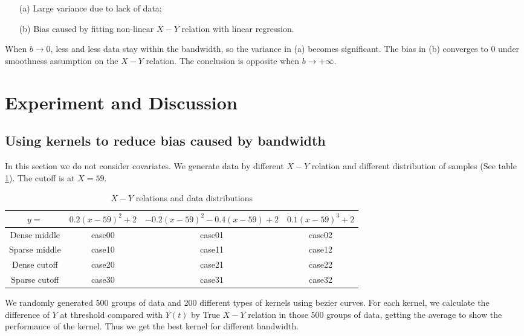 \documentclass[a4 paper,12pt]{article}
\begin{document}
\begin{enumerate}
   \item[(a)] Large variance due to lack of data;
   \item[(b)] Bias caused by fitting non-linear $X-Y$ relation with linear regression.
\end{enumerate}

When $b\to 0$, less and less data stay within the bandwidth, so the variance in (a) becomes significant. The bias in (b) converges to $0$ under smoothness assumption on the $X-Y$ relation. The conclusion is opposite when $b\to+\infty$.


\section{Experiment and Discussion}

\subsection{Using kernels to reduce bias caused by bandwidth}

In this section we do not consider covariates. We generate data by different $X-Y$ relation and different distribution of samples (See table \ref{table:kernels_test}). The cutoff is at $X=59$.

\begin{table}[h]
	\centering
   \begin{tabular}{|c|c|c|c|}
      \hline
      $y=$&$0.2(x-59)^2+2$&$-0.2(x-59)^2-0.4(x-59)+2$&$0.1(x-59)^3+2$\\
      \hline
      Dense middle&case00&case01&case02\\
      \hline
      Sparse middle&case10&case11&case12\\
      \hline
      Dense cutoff&case20&case21&case22\\
      \hline
      Sparse cutoff&case30&case31&case32\\
      \hline
   \end{tabular}
   \caption{$X-Y$ relations and data distributions}
   \label{table:kernels_test}
\end{table}

We randomly generated 500 groups of data and 200 different types of kernels using bezier curves. For each kernel, we calculate the difference of $Y$ at threshold compared with $Y(t)$ by True $X-Y$ relation in those 500 groups of data, getting the average to show the performance of the kernel. Thus we get the best kernel for different bandwidth.
\end{document}
